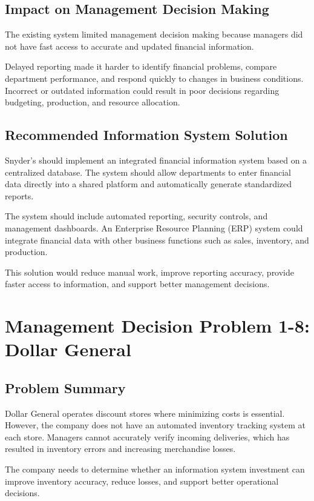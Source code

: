 \documentclass[12pt]{article}
\begin{document}
\subsection{Impact on Management Decision Making}

The existing system limited management decision making because managers did not have
fast access to accurate and updated financial information.

Delayed reporting made it harder to identify financial problems, compare department
performance, and respond quickly to changes in business conditions. Incorrect or
outdated information could result in poor decisions regarding budgeting, production,
and resource allocation.


\subsection{Recommended Information System Solution}

Snyder's should implement an integrated financial information system based on a
centralized database. The system should allow departments to enter financial data
directly into a shared platform and automatically generate standardized reports.

The system should include automated reporting, security controls, and management
dashboards. An Enterprise Resource Planning (ERP) system could integrate financial
data with other business functions such as sales, inventory, and production.

This solution would reduce manual work, improve reporting accuracy, provide faster
access to information, and support better management decisions.


\section{Management Decision Problem 1-8: Dollar General}

\subsection{Problem Summary}

Dollar General operates discount stores where minimizing costs is essential.
However, the company does not have an automated inventory tracking system at
each store. Managers cannot accurately verify incoming deliveries, which has
resulted in inventory errors and increasing merchandise losses.

The company needs to determine whether an information system investment can
improve inventory accuracy, reduce losses, and support better operational
decisions.
\end{document}
